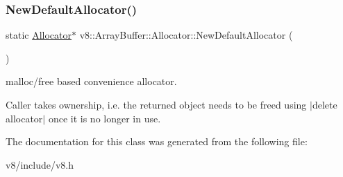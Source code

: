 \subsubsection{\texorpdfstring{New\+Default\+Allocator()}{NewDefaultAllocator()}}
{\footnotesize\ttfamily static \mbox{\hyperlink{classv8_1_1ArrayBuffer_1_1Allocator}{Allocator}}$\ast$ v8\+::\+Array\+Buffer\+::\+Allocator\+::\+New\+Default\+Allocator (\begin{DoxyParamCaption}{ }\end{DoxyParamCaption})\hspace{0.3cm}{\ttfamily [static]}}

malloc/free based convenience allocator.

Caller takes ownership, i.\+e. the returned object needs to be freed using $\vert$delete allocator$\vert$ once it is no longer in use. 

The documentation for this class was generated from the following file\+:\begin{DoxyCompactItemize}
\item 
v8/include/v8.\+h\end{DoxyCompactItemize}
